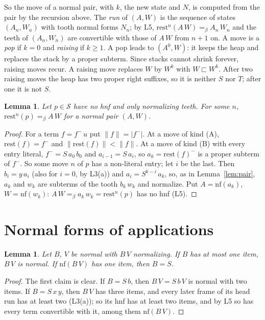 \documentclass[11pt]{amsart}
\newtheorem{lemma}[theorem]{Lemma}
\theoremstyle{definition}
\newcommand{\Ter}{\mathcal S}
\newcommand{\conv}{=_\beta}
\newcommand{\sz}[1]{\lvert#1\rvert}
\newcommand{\rest}{\mathrm{rest}}
\newcommand{\nf}{\mathrm{nf}}
\newcommand{\psq}{\sqsubset}
\begin{document}
So the move of a normal pair, with $k$, the new state and $N$, is computed from the pair by the
recursion above. The \emph{run} of $(A,W)$ is the sequence of states $(A_n,W_n)$ with tooth normal
forms $N_n$; by L5, $\rest^n(A\,W)\conv A_n\,W_n$ and the teeth of $(A_n,W_n)$ are convertible with
those of $A\,W$ from $n+1$ on. A move is a \emph{pop} if $k=0$ and \emph{raising} if $k\ge1$. A pop
leads to $(A^0,W)$: it keeps the heap and replaces the stack by a proper subterm. Since stacks
cannot shrink forever, raising moves recur. A raising move replaces $W$ by $W^k$ with
$W\psq W^k$. After two raising moves the heap has two proper right suffixes, so it is neither $S$
nor $T$; after one it is not $S$.

\begin{lemma}\label{lem:reach}
Let $p\in\Ter$ have no hnf and only normalizing teeth. For some $n$, $\rest^n(p)\conv A\,W$ for a
normal pair $(A,W)$.
\end{lemma}

\begin{proof}
For a term $f=f^-\,u$ put $\|f\|=\sz{f^-}$. At a move of kind (A), $\rest(f)=f^-$ and
$\|\rest(f)\|<\|f\|$. At a move of kind (B) with every entry literal, $f^-=S\,a_0\,b_0$ and
$a_{i-1}=S\,a_i$, so $a_k=\rest(f)^-$ is a proper subterm of $f^-$. So some move $n$ of $p$ has a
non-literal entry; let $i$ be the last. Then $b_i=y\,a_i$ (also for $i=0$, by L3(a)) and
$a_i=S^{k-i}\,a_k$, so, as in Lemma~\ref{lem:pair}, $a_k$ and $w_k$ are subterms of the tooth
$b_k\,w_k$ and normalize. Put $A=\nf(a_k)$, $W=\nf(w_k)$: $A\,W\conv a_k\,w_k=\rest^n(p)$ has no
hnf (L5).
\end{proof}

\section{Normal forms of applications}

\begin{lemma}\label{lem:h2}
Let $B$, $V$ be normal with $B\,V$ normalizing. If $B$ has at most one item, $B\,V$ is normal. If
$\nf(B\,V)$ has one item, then $B=S$.
\end{lemma}

\begin{proof}
The first claim is clear. If $B=S\,b$, then $B\,V=S\,b\,V$ is normal with two items. If
$B=S\,x\,y$, then $B\,V$ has three items, and every later frame of its head run has at least two
(L3(a)); so its hnf has at least two items, and by L5 so has every term convertible with it, among
them $\nf(B\,V)$.
\end{proof}
\end{document}
